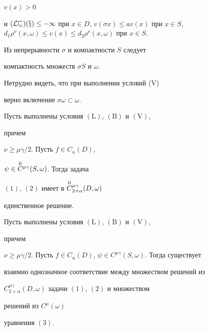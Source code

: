 $v(x)>0$ 


и $(\cal L v)(x)\le-1$ при $x\in D$, $v(\sigma x)\le av(x)$ при $x\in 


S$, $d_1\rho^\nu(x,\omega)\le v(x)\le d_2\rho^\nu(x,\omega)$ при $x\in 


S$. 


 


\begin{note} 


Из непрерывности $\sigma$ и компактности $S$ следует 


компактность множеств $\sigma S$ и $\omega$. 


\end{note} 


 


\begin{note} 


Нетрудно видеть, что при выполнении условий (V) 


верно включение $\sigma\omega\subset\omega$. 


\end{note} 


 


\begin{thm} 


Пусть выполнены условия $(\mathrm L)$, $(\mathrm B)$ и $(\mathrm V)$, 


причем 


$\nu\ge\mu\gamma/2$. Пусть $f\in C_\alpha(D)$, 


$\psi\in\overset{0}{C}{}^{\mu\gamma}(S,\omega)$. Тогда задача 


$(1)$, $(2)$ имеет в $\overset{0}{C}{}^{\mu\gamma}_{2+\alpha}(D,\omega)$ 


единственное решение. 


\end{thm} 


 


\begin{thm} 


Пусть выполнены условия $(\mathrm L)$, $(\mathrm B)$ и $(\mathrm V)$, 


причем 


$\nu\ge\mu\gamma/2$. Пусть $f\in C_\alpha(D)$, $\psi\in 


C^{\mu\gamma}(S,\omega)$. Тогда существует 


взаимно однозначное соответствие между множеством решений из 


$C^{\mu\gamma}_{2+\alpha}(D,\omega)$ задачи $(1)$, $(2)$ и множеством 


решений из $C^\mu(\omega)$ 


уравнения $(3)$. 


\end{thm} 


